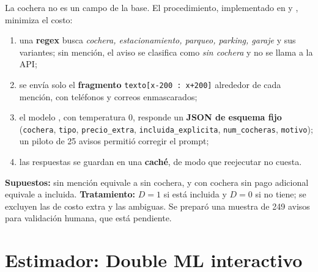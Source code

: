 La cochera no es un campo de la base. El procedimiento, implementado en  y , minimiza el costo:
\begin{enumerate}[leftmargin=*,itemsep=1pt]
\item una \textbf{regex} busca \emph{cochera, estacionamiento, parqueo, parking, garaje} y sus variantes; sin mención, el aviso se clasifica como \emph{sin cochera} y no se llama a la API;
\item se envía solo el \textbf{fragmento} \texttt{texto[x-200 : x+200]} alrededor de cada mención, con teléfonos y correos enmascarados;
\item el modelo , con temperatura 0, responde un \textbf{JSON de esquema fijo} (\texttt{cochera}, \texttt{tipo}, \texttt{precio\_extra}, \texttt{incluida\_explicita}, \texttt{num\_cocheras}, \texttt{motivo}); un piloto de 25 avisos permitió corregir el prompt;
\item las respuestas se guardan en una \textbf{caché}, de modo que reejecutar no cuesta.
\end{enumerate}
\textbf{Supuestos:} sin mención equivale a sin cochera, y con cochera sin pago adicional equivale a incluida. \textbf{Tratamiento:} $D=1$ si está incluida y $D=0$ si no tiene; se excluyen las de costo extra y las ambiguas. Se preparó una muestra de 249 avisos para validación humana, que está pendiente.

\section{Estimador: Double ML interactivo}\label{sec:irm}

